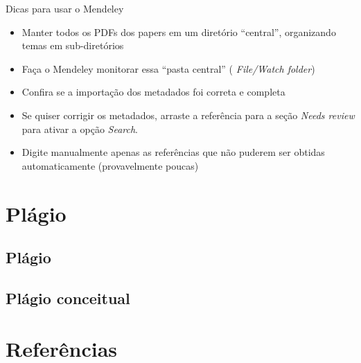 \documentclass{beamer}
\begin{document}
\begin{frame}{Dicas para usar o Mendeley}
  \begin{itemize}
  \item Manter \alert{todos} os PDFs dos papers em um diretório
    ``central'', organizando temas em sub-diretórios
  \item Faça o Mendeley \alert{monitorar} essa ``pasta central'' ({\em
      File/Watch folder})
  \item Confira se a importação dos metadados foi correta e completa
  \item Se quiser corrigir os metadados, arraste a referência para a
    seção {\em Needs review} para ativar a opção {\em Search}.
  \item Digite manualmente apenas as referências que não puderem ser
    obtidas automaticamente (provavelmente poucas)
  \end{itemize}
\end{frame}

\section{Plágio}

\subsection{Plágio}

\subsection{Plágio conceitual}


\section{Referências}
\end{document}

